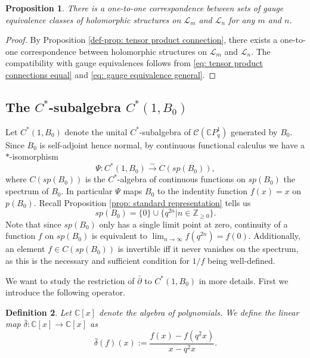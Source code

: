 \documentclass[12pt]{article}
\newtheorem{definition}{Definition}[section]
\newtheorem{proposition}[definition]{Proposition}
\numberwithin{equation}{section}
\def\pb{\bar{\partial}}
\def\db{\bar{\delta}}
\def\Z{{\mathbb Z}}
\def\C{{\mathbb C}}
\def\L{\mathcal{L}}
\begin{document}
\begin{proposition}\label{prop: one-one corrspondence gauge equivalence class}
There is a one-to-one correspondence between sets of gauge equivalence classes of holomorphic structures on $\L_m$ and $\L_n$ for any $m$ and $n$.
\end{proposition}
\begin{proof}
By Proposition \ref{def-prop: tensor product connection}, there exists a  one-to-one correspondence between  holomorphic structures on $\L_m$ and $\L_n$. The compatibility with gauge equivalences follows from \eqref{eq: tensor product connections equal} and \eqref{eq: gauge equivalence general}.
\end{proof}





\subsection{The $C^*$-subalgebra $C^*(1, B_0)$}\label{subsection: C^*(1, B_0)}

Let $C^*(1, B_0)$ denote the unital $C^*$-subalgebra of $\mathcal{C}(\C P^1_q)$ generated by $B_0$.
Since $B_0$ is self-adjoint hence normal,  by continuous functional calculus we have a $*$-isomorphism
\begin{equation}\label{eq: functional calculus B0}
\Psi: C^*(1, B_0)\overset{\sim}{\to}C(sp(B_0)),
\end{equation}
where $C(sp(B_0))$ is the $C^*$-algebra of continuous functions on $sp(B_0)$ the spectrum of $B_0$. In particular $\Psi$ maps $B_0$ to the indentity function $f(x)=x$ on $p(B_0)$.
Recall Proposition \ref{prop: standard representation} tells us
\begin{equation}\label{eq: sp B0}
sp(B_0)=\{0\} \cup \{q^{2n} | n \in \Z_{\geq 0} \}.
\end{equation}
Note that since $sp(B_0)$ only has a single limit point at zero, continuity of a function $f$ on $sp(B_0)$ is equivalent to $\lim_{n \to \infty} f(q^{2n}) = f(0).$ Additionally, an element $f \in C(sp(B_0))$ is invertible iff it never vanishes on the spectrum, as this is the necessary and sufficient condition for $1/f$ being well-defined.
 
We want to study the restriction of $\pb$ to $C^*(1, B_0)$ in more details. First we introduce the following operator.

\begin{definition}\label{def: db}
 Let $\C[x]$ denote the algebra of polynomials.   We define the linear map $\db: \C[x] \to \C[x]$ as 
 \begin{equation}\label{eq: def of db}
 \db(f)(x):=\frac{f(x)-f(q^2x)}{x-q^2x}.
 \end{equation}
\end{definition}
\end{document}
